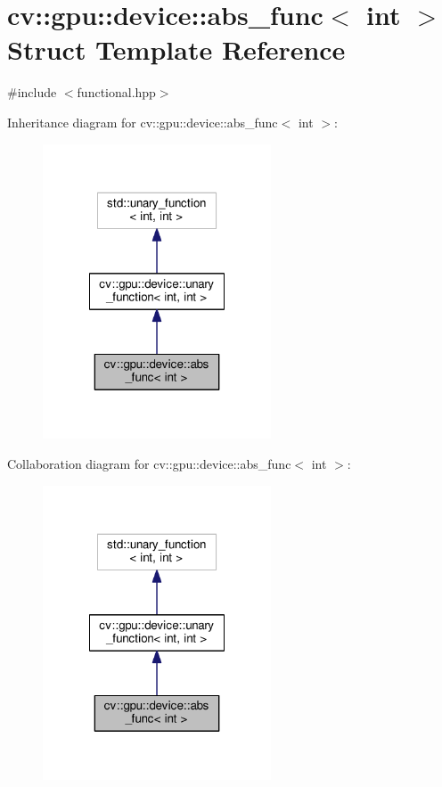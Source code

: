 \hypertarget{structcv_1_1gpu_1_1device_1_1abs__func_3_01int_01_4}{\section{cv\-:\-:gpu\-:\-:device\-:\-:abs\-\_\-func$<$ int $>$ Struct Template Reference}
\label{structcv_1_1gpu_1_1device_1_1abs__func_3_01int_01_4}
}


{\ttfamily \#include $<$functional.\-hpp$>$}



Inheritance diagram for cv\-:\-:gpu\-:\-:device\-:\-:abs\-\_\-func$<$ int $>$\-:\nopagebreak
\begin{figure}[H]
\begin{center}
\leavevmode
\includegraphics[width=192pt]{structcv_1_1gpu_1_1device_1_1abs__func_3_01int_01_4__inherit__graph}
\end{center}
\end{figure}


Collaboration diagram for cv\-:\-:gpu\-:\-:device\-:\-:abs\-\_\-func$<$ int $>$\-:\nopagebreak
\begin{figure}[H]
\begin{center}
\leavevmode
\includegraphics[width=192pt]{structcv_1_1gpu_1_1device_1_1abs__func_3_01int_01_4__coll__graph}
\end{center}
\end{figure}
